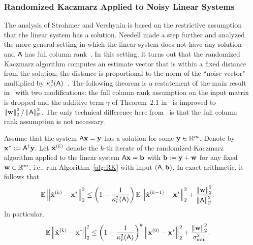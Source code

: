 \subsubsection{Randomized Kaczmarz Applied to Noisy Linear Systems}
The analysis of Strohmer and Vershynin is based on the restrictive assumption that the linear system has a solution. Needell made a step further and analyzed the more general setting in which the linear system does not have any solution and ${\mathsf{A} }$ has full column rank~\cite{Needell09}. In this setting, it turns out that the randomized Kaczmarz algorithm computes an estimate vector that is within a fixed distance from the solution; the distance is proportional to the norm of the ``noise vector'' multiplied by $\kappa^2_{\textrm{\tiny F}}({\mathsf{A} })$~\cite{Needell09}. The following theorem is a restatement of the main result in~\cite{Needell09} with two modifications: the full column rank assumption on the input matrix is dropped and the additive term $\gamma$ of Theorem~$2.1$ in~\cite{Needell09} is improved to $\left\|{\mathbf{w}}\right\|_2^2/\left\|{\mathsf{A} }\right\|_{\textrm{F}}^2$. The only technical difference here from~\cite{Needell09} is that the full column rank assumption is not necessary.
%
\begin{theorem}\label{thm:RK:inconsistent}
Assume that the system ${\mathsf{A} } \mathbf{x} = \mathbf{y}$ has a solution for some $\mathbf{y}\in\mathbb{R}^m$. Denote by $\mathbf{x}^{*} := {{\mathsf{A} }}^\dagger\mathbf{y}$. Let $\hat{\mathbf{x}}^{(k)}$ denote the $k$-th iterate of the randomized Kaczmarz algorithm applied to the linear system ${\mathsf{A} } \mathbf{x} = {\mathbf b}$ with ${\mathbf b}:=\mathbf{y} + {\mathbf{w}}$ for any fixed ${\mathbf{w}}\in\mathbb{R}^m$, i.e., run Algorithm~\ref{alg:RK} with input $({\mathsf{A} },{\mathbf b})$. In exact arithmetic, it follows that
%
\begin{equation}\label{ineq:relaxRK}
\operatorname{\mathbb{E}} \left\|\hat{\mathbf{x}}^{(k)} - \mathbf{x}^{*}\right\|_2^2 \le \left(1-\frac1{\kappa^2_{\textrm{\tiny F}}({\mathsf{A} })}\right)\operatorname{\mathbb{E}} \left\|\hat{\mathbf{x}}^{(k-1)} - \mathbf{x}^{*}\right\|_2^2 + \frac{\left\|{\mathbf{w}}\right\|_2^2}{\left\|{\mathsf{A} }\right\|_{\textrm{F}}^2}.
\end{equation}
%
%
In particular,
\[\operatorname{\mathbb{E}} \left\|\hat{\mathbf{x}}^{(k)} - \mathbf{x}^{*}\right\|_2^2 \le \left(1-\frac1{\kappa^2_{\textrm{\tiny F}}({\mathsf{A} })}\right)^k \left\|\mathbf{x}^{(0)}- \mathbf{x}^{*}\right\|_2^2 + \frac{\left\|{\mathbf{w}}\right\|_2^2}{\sigma^2_{\min} }.\]
%
%
\end{theorem}
%
%
%
